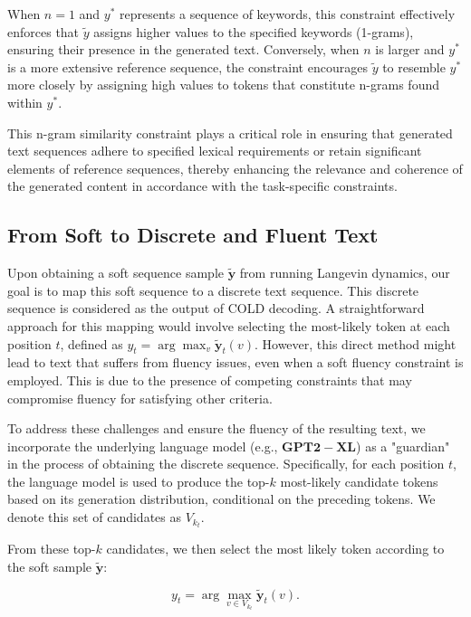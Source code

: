 \documentclass{article}
\begin{document}
When \(n = 1\) and \(y^*\) represents a sequence of keywords, this constraint effectively enforces that \(\tilde{y}\) assigns higher values to the specified keywords (1-grams), ensuring their presence in the generated text. Conversely, when \(n\) is larger and \(y^*\) is a more extensive reference sequence, the constraint encourages \(\tilde{y}\) to resemble \(y^*\) more closely by assigning high values to tokens that constitute n-grams found within \(y^*\).

This n-gram similarity constraint plays a critical role in ensuring that generated text sequences adhere to specified lexical requirements or retain significant elements of reference sequences, thereby enhancing the relevance and coherence of the generated content in accordance with the task-specific constraints.

\subsection{From Soft to Discrete and Fluent Text}

Upon obtaining a soft sequence sample \(\mathbf{\tilde{y}}\) from running Langevin dynamics, our goal is to map this soft sequence to a discrete text sequence. This discrete sequence is considered as the output of COLD decoding. A straightforward approach for this mapping would involve selecting the most-likely token at each position \(t\), defined as \(y_t = \arg\max_v \mathbf{\tilde{y}}_t(v)\). However, this direct method might lead to text that suffers from fluency issues, even when a soft fluency constraint is employed. This is due to the presence of competing constraints that may compromise fluency for satisfying other criteria.

To address these challenges and ensure the fluency of the resulting text, we incorporate the underlying language model (e.g., \( \mathbf{GPT2-XL} \)) as a "guardian" in the process of obtaining the discrete sequence. Specifically, for each position \(t\), the language model is used to produce the top-\(k\) most-likely candidate tokens based on its generation distribution, conditional on the preceding tokens. We denote this set of candidates as \(V_{k_t}\).

From these top-\(k\) candidates, we then select the most likely token according to the soft sample \(\mathbf{\tilde{y}}\):

\begin{equation}
    y_t = \arg\max_{v \in V_{k_t}} \mathbf{\tilde{y}}_t(v).
\end{equation}
\end{document}
